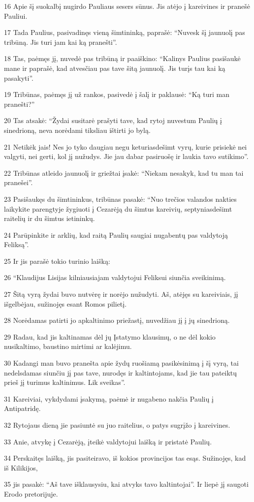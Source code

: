 \par 16 Apie šį suokalbį nugirdo Pauliaus sesers sūnus. Jis atėjo į kareivines ir pranešė Pauliui. 
\par 17 Tada Paulius, pasivadinęs vieną šimtininką, paprašė: “Nuvesk šį jaunuolį pas tribūną. Jis turi jam kai ką pranešti”. 
\par 18 Tas, paėmęs jį, nuvedė pas tribūną ir paaiškino: “Kalinys Paulius pasišaukė mane ir paprašė, kad atvesčiau pas tave šitą jaunuolį. Jis turįs tau kai ką pasakyti”. 
\par 19 Tribūnas, paėmęs jį už rankos, pasivedė į šalį ir paklausė: “Ką turi man pranešti?” 
\par 20 Tas atsakė: “Žydai susitarė prašyti tave, kad rytoj nuvestum Paulių į sinedrioną, neva norėdami tiksliau ištirti jo bylą. 
\par 21 Netikėk jais! Nes jo tyko daugiau negu keturiasdešimt vyrų, kurie prisiekė nei valgyti, nei gerti, kol jį nužudys. Jie jau dabar pasiruošę ir laukia tavo sutikimo”. 
\par 22 Tribūnas atleido jaunuolį ir griežtai įsakė: “Niekam nesakyk, kad tu man tai pranešei”. 
\par 23 Pasišaukęs du šimtininkus, tribūnas pasakė: “Nuo trečios valandos nakties laikykite parengtyje žygiuoti į Cezarėją du šimtus kareivių, septyniasdešimt raitelių ir du šimtus ietininkų. 
\par 24 Parūpinkite ir arklių, kad raitą Paulių saugiai nugabentų pas valdytoją Feliksą”. 
\par 25 Ir jis parašė tokio turinio laišką: 
\par 26 “Klaudijus Lisijas kilniausiajam valdytojui Feliksui siunčia sveikinimą. 
\par 27 Šitą vyrą žydai buvo nutvėrę ir norėjo nužudyti. Aš, atėjęs su kareiviais, jį išgelbėjau, sužinojęs esant Romos pilietį. 
\par 28 Norėdamas patirti jo apkaltinimo priežastį, nuvedžiau jį į jų sinedrioną. 
\par 29 Radau, kad jis kaltinamas dėl jų Įstatymo klausimų, o ne dėl kokio nusikaltimo, baustino mirtimi ar kalėjimu. 
\par 30 Kadangi man buvo pranešta apie žydų ruošiamą pasikėsinimą į šį vyrą, tai nedelsdamas siunčiu jį pas tave, nurodęs ir kaltintojams, kad jie tau pateiktų prieš jį turimus kaltinimus. Lik sveikas”. 
\par 31 Kareiviai, vykdydami įsakymą, paėmė ir nugabeno nakčia Paulių į Antipatridę. 
\par 32 Rytojaus dieną jie pasiuntė su juo raitelius, o patys sugrįžo į kareivines. 
\par 33 Anie, atvykę į Cezarėją, įteikė valdytojui laišką ir pristatė Paulių. 
\par 34 Perskaitęs laišką, jis pasiteiravo, iš kokios provincijos tas esąs. Sužinojęs, kad iš Kilikijos, 
\par 35 jis pasakė: “Aš tave išklausysiu, kai atvyks tavo kaltintojai”. Ir liepė jį saugoti Erodo pretorijuje.


